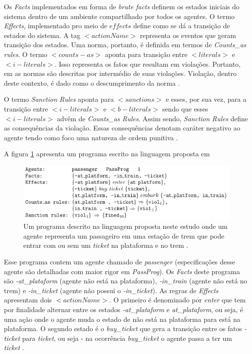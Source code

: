 Os \textit{Facts} implementados em forma de \textit{brute facts} definem os estados iniciais do sistema dentro de um ambiente compartilhado por todos os agentes. O termo \textit{Effects}, implementado pro meio de $effects$ define como se dá a transição de estados do sistema. A tag $<actionName>$ representa os eventos que geram transição dos estados. Uma norma, portanto, é definida em termos de \textit{Counts\_as rules}. O termo $<counts-as>$ aponta para transição entre $<literals>$ e $<i-literals>$. Isso representa os fatos que resultam em violações. Portanto, em \cite{dastaniframework} as normas são descritas por intermédio de suas violações. Violação, dentro deste contexto, é dado como o descumprimento da norma 
\cite{ontologynormative}.

O termo \textit{Sanction Rules} aponta para $<sanctions>$ e esses, por sua vez, para a transição entre $<i-literals>$ e $<b-literals>$ sendo que esses $<i-literals>$ advêm de \textit{Counts\_as Rules}. Assim sendo, \textit{Sanction Rules} define as consequências da violação. Essas consequências denotam caráter negativo ao agente tendo como foco uma natureza de ordem punitiva \cite{dastaniframework}. 

A figura \ref{exemploprograma} apresenta um programa escrito na linguagem proposta em  

\begin{figure}[H]
  \centering
  \includegraphics[width=0.8\linewidth]{figure/programdastani.png} 
  \caption{Um programa descrito na linguagem proposta neste estudo onde um agente representa um passageiro em uma estação de trem que pode entrar com ou sem um \textit{ticket} na plataforma e no trem \cite{dastaniframework}.}
  \label{exemploprograma}
\end{figure}

Esse programa contem um agente chamado de \textit{passenger} (especificações desse agente são detalhadas com maior rigor em \textit{PassProg}). Os \textit{Facts} deste programa são \textit{-at\_plataform} (agente não está na plataforma), \textit{-in\_train} (agente não está no trem) e \textit{-in\_ticket} (agente não possui o \textit{-in\_ticket}). As regras de \textit{Effects} apresentam dois $<actionName>$. O primeiro é denominado por \textit{enter} que tem por finalidade alternar entre os estados \textit{-at\_plataform} e \textit{at\_plataform}, 
ou seja, é uma ação onde o agente muda o estado de não está na plataforma para está na plataforma. O segundo estado é o \textit{buy\_ticket} que gera a transição entre os fatos \textit{-ticket} para \textit{ticket}, ou seja - na ocorrência \textit{buy\_ticket} o agente passa a ter um \textit{ticket} \cite{dastaniframework}.


